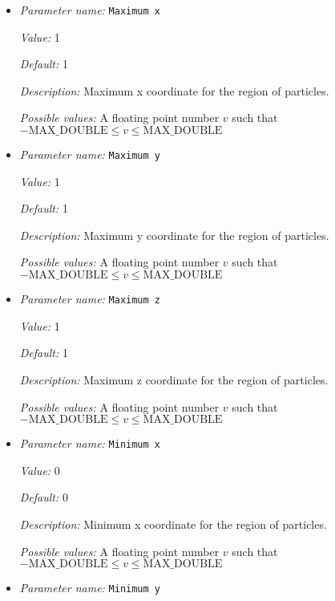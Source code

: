 \begin{itemize}
\item {\it Parameter name:} {\tt Maximum x}
\label{parameters:Postprocess/Particles/Generator/Uniform box/Maximum x}


{\it Value:} 1


{\it Default:} 1


{\it Description:} Maximum x coordinate for the region of particles.


{\it Possible values:} A floating point number $v$ such that $-\text{MAX\_DOUBLE} \leq v \leq \text{MAX\_DOUBLE}$
\item {\it Parameter name:} {\tt Maximum y}
\label{parameters:Postprocess/Particles/Generator/Uniform box/Maximum y}


{\it Value:} 1


{\it Default:} 1


{\it Description:} Maximum y coordinate for the region of particles.


{\it Possible values:} A floating point number $v$ such that $-\text{MAX\_DOUBLE} \leq v \leq \text{MAX\_DOUBLE}$
\item {\it Parameter name:} {\tt Maximum z}
\label{parameters:Postprocess/Particles/Generator/Uniform box/Maximum z}


{\it Value:} 1


{\it Default:} 1


{\it Description:} Maximum z coordinate for the region of particles.


{\it Possible values:} A floating point number $v$ such that $-\text{MAX\_DOUBLE} \leq v \leq \text{MAX\_DOUBLE}$
\item {\it Parameter name:} {\tt Minimum x}
\label{parameters:Postprocess/Particles/Generator/Uniform box/Minimum x}


{\it Value:} 0


{\it Default:} 0


{\it Description:} Minimum x coordinate for the region of particles.


{\it Possible values:} A floating point number $v$ such that $-\text{MAX\_DOUBLE} \leq v \leq \text{MAX\_DOUBLE}$
\item {\it Parameter name:} {\tt Minimum y}
\label{parameters:Postprocess/Particles/Generator/Uniform box/Minimum y}



\end{itemize}
